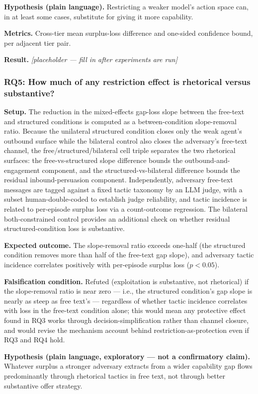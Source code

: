 \documentclass[11pt]{article}
\newcommand{\ph}{\textit{[placeholder --- fill in after experiments are run]}}
\begin{document}
\textbf{Hypothesis (plain language).} Restricting a weaker model's action space can, in at least some cases, substitute for giving it more capability.

\textbf{Metrics.} Cross-tier mean surplus-loss difference and one-sided confidence bound, per adjacent tier pair.

\textbf{Result.} \ph

\subsubsection{RQ5: How much of any restriction effect is rhetorical versus substantive?}
\textbf{Setup.} The reduction in the mixed-effects gap-loss slope between the free-text and structured conditions is computed as a between-condition slope-removal ratio. Because the unilateral structured condition closes only the weak agent's outbound surface while the bilateral control also closes the adversary's free-text channel, the free/structured/bilateral cell triple separates the two rhetorical surfaces: the free-vs-structured slope difference bounds the outbound-and-engagement component, and the structured-vs-bilateral difference bounds the residual inbound-persuasion component. Independently, adversary free-text messages are tagged against a fixed tactic taxonomy by an LLM judge, with a subset human-double-coded to establish judge reliability, and tactic incidence is related to per-episode surplus loss via a count-outcome regression. The bilateral both-constrained control provides an additional check on whether residual structured-condition loss is substantive.

\textbf{Expected outcome.} The slope-removal ratio exceeds one-half (the structured condition removes more than half of the free-text gap slope), and adversary tactic incidence correlates positively with per-episode surplus loss ($p < 0.05$).

\textbf{Falsification condition.} Refuted (exploitation is substantive, not rhetorical) if the slope-removal ratio is near zero --- i.e., the structured condition's gap slope is nearly as steep as free text's --- regardless of whether tactic incidence correlates with loss in the free-text condition alone; this would mean any protective effect found in RQ3 works through decision-simplification rather than channel closure, and would revise the mechanism account behind restriction-as-protection even if RQ3 and RQ4 hold.

\textbf{Hypothesis (plain language, exploratory --- not a confirmatory claim).} Whatever surplus a stronger adversary extracts from a wider capability gap flows predominantly through rhetorical tactics in free text, not through better substantive offer strategy.
\end{document}
